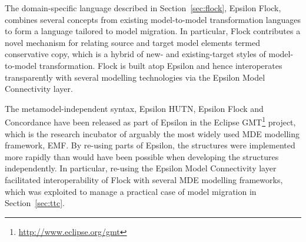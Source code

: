 The domain-specific language described in Section~\ref{sec:flock}, Epsilon Flock, combines several concepts from existing model-to-model transformation languages to form a language tailored to model migration. In particular, Flock contributes a novel mechanism for relating source and target model elements termed conservative copy, which is a hybrid of new- and existing-target styles of model-to-model transformation. Flock is built atop Epsilon and hence interoperates transparently with several modelling technologies via the Epsilon Model Connectivity layer. 

The metamodel-independent syntax, Epsilon HUTN, Epsilon Flock and Concordance have been released as part of Epsilon in the Eclipse GMT\footnote{\url{http://www.eclipse.org/gmt}} project, which is the research incubator of arguably the most widely used MDE modelling framework, EMF. By re-using parts of Epsilon, the structures were implemented more rapidly than would have been possible when developing the structures independently. In particular, re-using the Epsilon Model Connectivity layer facilitated interoperability of Flock with several MDE modelling frameworks, which was exploited to manage a practical case of model migration in Section~\ref{sec:ttc}.
